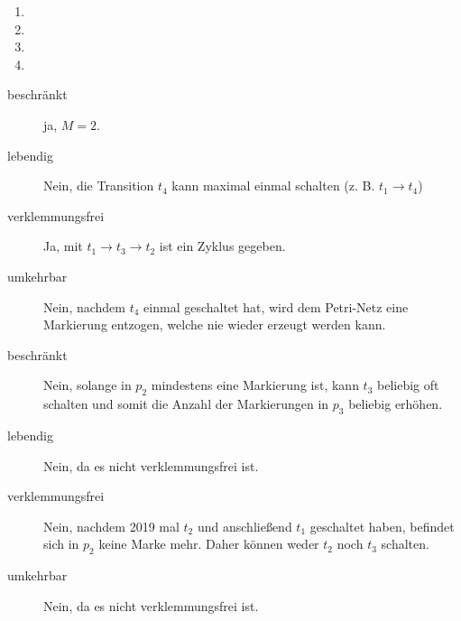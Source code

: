 \documentclass{lehramt-informatik-aufgabe}
\begin{document}
\begin{enumerate}
\item {}
\item {}
\item {}
\item {}

\end{enumerate}

\begin{liAntwort}


\tikzset{/petri/.cd,x=2,y=2,scale=0.45}

\noindent
{}
%
%
%

\begin{description}
\item[beschränkt] ja, $M = 2$.

\item[lebendig] Nein, die Transition $t_4$ kann maximal einmal schalten
(z. B. $t_1 \rightarrow t_4$)

\item[verklemmungsfrei] Ja, mit $t_1 \rightarrow t_3 \rightarrow  t_2$
ist ein Zyklus gegeben.

\item[umkehrbar] Nein, nachdem $t_4$ einmal geschaltet hat, wird dem
Petri-Netz eine Markierung entzogen, welche nie wieder erzeugt werden
kann.
\end{description}


\begin{description}
\item[beschränkt] Nein, solange in $p_2$ mindestens eine Markierung ist,
kann $t_3$ beliebig oft schalten und somit die Anzahl der Markierungen
in $p_3$ beliebig erhöhen.

\item[lebendig] Nein, da es nicht verklemmungsfrei ist.

\item[verklemmungsfrei] Nein, nachdem 2019 mal $t_2$ und anschließend
$t_1$ geschaltet haben, befindet sich in $p_2$ keine Marke mehr. Daher
können weder $t_2$ noch $t_3$ schalten.

\item[umkehrbar]
Nein, da es nicht verklemmungsfrei ist.
\end{description}


\end{liAntwort}
\end{document}

